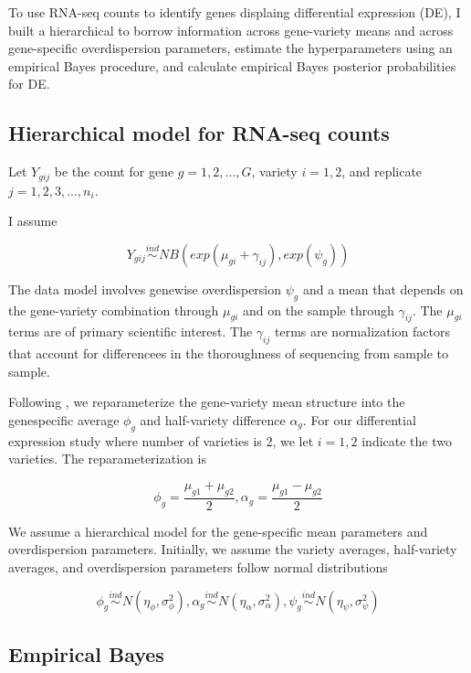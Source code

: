 \documentclass[11pt]{isuthesis}
\begin{document}
To use RNA-seq counts to identify genes displaing differential expression (DE), I built a hierarchical to borrow information across gene-variety means and across gene-specific overdispersion parameters, estimate the hyperparameters using an empirical Bayes procedure, and calculate empirical Bayes posterior probabilities for DE. 

\subsection{Hierarchical model for RNA-seq counts}

Let $Y_{gij}$ be the count for gene $g=1,2,..., G$, variety $i=1,2$, and replicate $j=1,2,3,...,n_i$.

I assume

\begin{equation}
\label{eq:1}
Y_{gij} \stackrel{ind}{\sim} NB(exp(\mu_{gi}+\gamma_{ij}), exp(\psi_g))
\end{equation}

The data model involves genewise overdispersion $\psi_g$ and a mean that depends on the gene-variety combination through $\mu_{gi}$ and on the sample through $\gamma_{ij}$. The $\mu_{gi}$ terms are of primary scientific interest. The $\gamma_{ij}$ terms are normalization factors that account for differencees in the thoroughness of sequencing from sample to sample. 

Following \citep{ji2014estimation}, we reparameterize the gene-variety mean structure into the genespecific average $\phi_g$ and half-variety difference $\alpha_g$. For our differential expression study where number of varieties is 2, we let $i=1,2$ indicate the two varieties. The reparameterization is

$$\phi_g = \frac{\mu_{g1}+\mu_{g2}}{2}, \alpha_g = \frac{\mu_{g1}-\mu_{g2}}{2}$$

We assume a hierarchical model for the gene-specific mean parameters and overdispersion parameters. Initially, we assume the variety averages, half-variety averages, and overdispersion parameters follow normal distributions

$$\phi_g \stackrel{ind}{\sim} N(\eta_\phi, \sigma^2_\phi), \alpha_g \stackrel{ind}{\sim} N(\eta_\alpha , \sigma^2_\alpha), \psi_g \stackrel{ind}{\sim} N(\eta_\psi, \sigma^2_\psi) $$

\subsection{Empirical Bayes}
\end{document}
